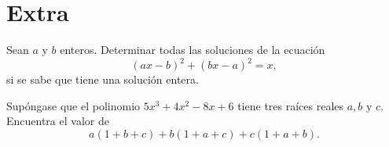 \section{Extra}

\begin{section-problem}
    Sean $a$ y $b$ enteros. Determinar todas las soluciones de la ecuación
    \[(ax - b)^2 + (bx - a)^2 =  x,\] si se sabe que tiene una solución entera.
\end{section-problem}

\begin{section-problem}
    Supóngase que el polinomio $5x^3 + 4x^2 - 8x + 6$ tiene tres raíces reales $a, b \mbox{ y } c$. Encuentra el valor de
    \[a(1 + b + c) + b(1 + a + c) + c(1 + a + b).\]
\end{section-problem}